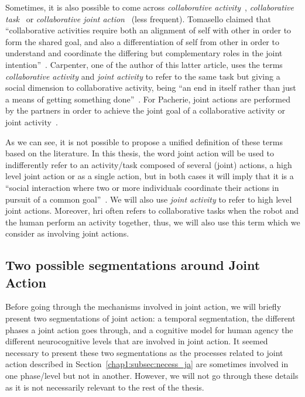 \documentclass[a4paper,11pt,twoside]{StyleThese}
\begin{document}
Sometimes, it is also possible to come across \emph{collaborative activity}~\cite{tomasello_2005_understanding}, \emph{collaborative task}~\cite{brennan_2008_coordinating} or \emph{collaborative joint action}~\cite{godman_2013_we} (less frequent). Tomasello \etal{} claimed that ``collaborative activities require both an alignment of self with other in order to form the shared goal, and also a differentiation of self from other in order to understand and coordinate the differing but complementary roles in the joint intention''~\cite[p.~681]{tomasello_2005_understanding}. Carpenter, one of the author of this latter article, uses the terms \emph{collaborative activity} and \emph{joint activity} to refer to the same task but giving a social dimension to collaborative activity, being ``an end in itself rather than just a means of getting something done''~\cite[p.~384]{carpenter_2009_just}. For Pacherie, joint actions are performed by the partners in order to achieve the joint goal of a collaborative activity or joint activity~\cite{pacherie_2013_intentional}.

As we can see, it is not possible to propose a unified definition of these terms based on the literature. In this thesis, the word joint action will be used to indifferently refer to an activity/task composed of several (joint) actions, \ie a high level joint action or as a single action, but in both cases it will imply that it is a ``social interaction where two or more individuals coordinate their actions in pursuit of a common goal''~\cite{castro_2020_joint}. We will also use \textit{joint activity} to refer to high level joint actions. Moreover, \acrshort{hri} often refers to collaborative tasks when the robot and the human perform an activity together, thus, we will also use this term which we consider as involving joint actions.

\subsection{Two possible segmentations around Joint Action}

Before going through the mechanisms involved in joint action, we will briefly present two segmentations of joint action: a temporal segmentation, \ie the different phases a joint action goes through, and a cognitive model for human agency \ie the different neurocognitive levels that are involved in joint action. It seemed necessary to present these two segmentations as the processes related to joint action described in Section~\ref{chap1:subsec:necess_ja} are sometimes involved in one phase/level but not in another. However, we will not go through these details as it is not necessarily relevant to the rest of the thesis.
\end{document}
